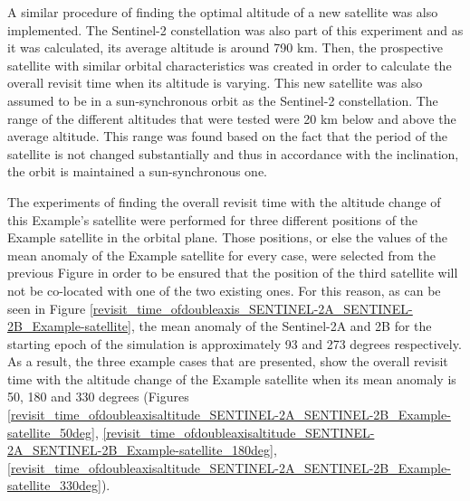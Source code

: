 

A similar procedure of finding the optimal altitude of a new satellite was also implemented. The Sentinel-2 constellation was also part of this experiment and as it was calculated, its average altitude is around 790 km. Then, the prospective satellite with similar orbital characteristics was created in order to calculate the overall revisit time when its altitude is varying. This new satellite was also assumed to be in a sun-synchronous orbit as the Sentinel-2 constellation. The range of the different altitudes that were tested were 20 km below and above the average altitude. This range was found based on the fact that the period of the satellite is not changed substantially and thus in accordance with the inclination, the orbit is maintained a sun-synchronous one.

The experiments of finding the overall revisit time with the altitude change of this Example's satellite were performed for three different positions of the Example satellite in the orbital plane. Those positions, or else the values of the mean anomaly of the Example satellite for every case, were selected from the previous Figure in order to be ensured that the position of the third satellite will not be co-located with one of the two existing ones. For this reason, as can be seen in Figure \ref{revisit_time_ofdoubleaxis_SENTINEL-2A_SENTINEL-2B_Example-satellite}, the mean anomaly of the Sentinel-2A and 2B for the starting epoch of the simulation is approximately 93 and 273 degrees respectively. As a result, the three example cases that are presented, show the overall revisit time with the altitude change of the Example satellite when its mean anomaly is 50, 180 and 330 degrees (Figures \ref{revisit_time_ofdoubleaxisaltitude_SENTINEL-2A_SENTINEL-2B_Example-satellite_50deg}, \ref{revisit_time_ofdoubleaxisaltitude_SENTINEL-2A_SENTINEL-2B_Example-satellite_180deg}, \ref{revisit_time_ofdoubleaxisaltitude_SENTINEL-2A_SENTINEL-2B_Example-satellite_330deg}).

